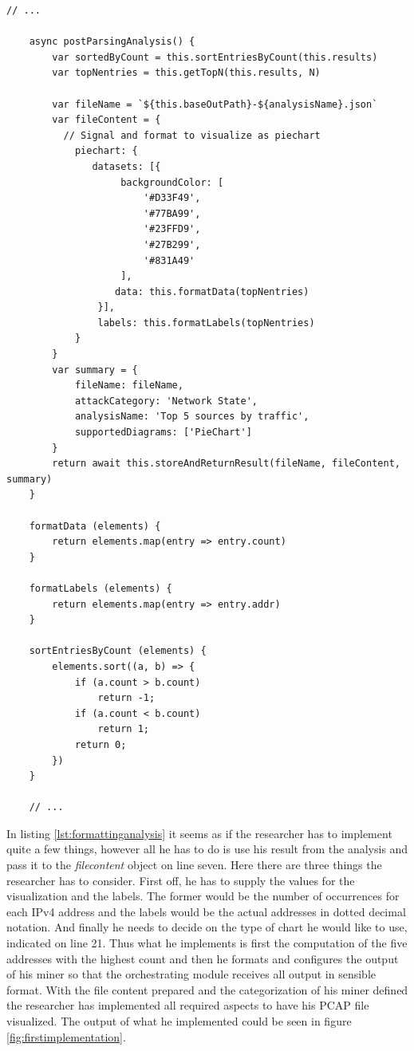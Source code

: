 \begin{lstlisting}[caption={Initial content of the newly create Miner},float=H,label={lst:formattinganalysis}]
    // ...
    
    async postParsingAnalysis() {
        var sortedByCount = this.sortEntriesByCount(this.results)
        var topNentries = this.getTopN(this.results, N)
 
        var fileName = `${this.baseOutPath}-${analysisName}.json`
        var fileContent = {
          // Signal and format to visualize as piechart
            piechart: {
               datasets: [{
                    backgroundColor: [
                        '#D33F49',
                        '#77BA99',
                        '#23FFD9',
                        '#27B299',
                        '#831A49'
                    ],
                   data: this.formatData(topNentries)
                }],
                labels: this.formatLabels(topNentries)
            }
        }
        var summary = {
            fileName: fileName,
            attackCategory: 'Network State',
            analysisName: 'Top 5 sources by traffic',
            supportedDiagrams: ['PieChart']
        }
        return await this.storeAndReturnResult(fileName, fileContent, summary)
    }
 
    formatData (elements) {
        return elements.map(entry => entry.count)
    }
 
    formatLabels (elements) {
        return elements.map(entry => entry.addr)
    }
  
    sortEntriesByCount (elements) {
        elements.sort((a, b) => {
            if (a.count > b.count)
                return -1;
            if (a.count < b.count)
                return 1;
            return 0;
        })
    }
    
    // ...

\end{lstlisting}
In listing \ref{lst:formattinganalysis} it seems as if the researcher has to implement quite a few things, however all he has to do is use his result from the analysis and pass it to the \textit{filecontent} object on line seven. Here there are three things the researcher has to consider. First off, he has to supply the values for the visualization and the labels. The former would be the number of occurrences for each IPv4 address and the labels would be the actual addresses in dotted decimal notation. And finally he needs to decide on the type of chart he would like to use, indicated on line 21. Thus what he implements is first the computation of the five addresses with the highest count and then he formats and configures the output of his miner so that the orchestrating module receives all output in sensible format.
With the file content prepared and the categorization of his miner defined the researcher has implemented all required aspects to have his PCAP file visualized. The output of what he implemented could be seen in figure \ref{fig:firstimplementation}.

